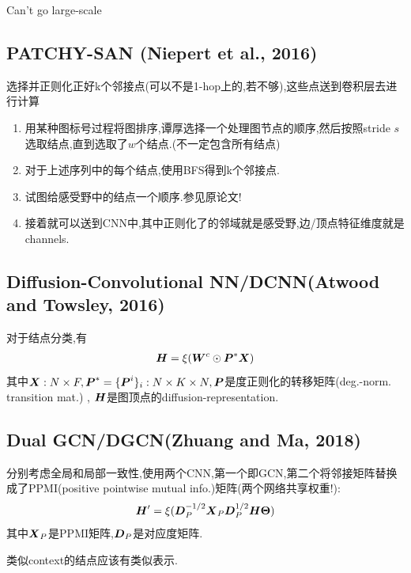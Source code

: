 \documentclass{article}
\begin{document}
 Can't go large-scale

\subsection{PATCHY-SAN (Niepert et al., 2016)}

 选择并正则化正好k个邻接点(可以不是1-hop上的,若不够),这些点送到卷积层去进行计算

\begin{enumerate}
    \item {} 用某种图标号过程将图排序,谭厚选择一个处理图节点的顺序,然后按照stride $s$选取结点,直到选取了$w$个结点.(不一定包含所有结点)
    \item {} 对于上述序列中的每个结点,使用BFS得到k个邻接点.
    \item {} 试图给感受野中的结点一个顺序.参见原论文!
    \item {} 接着就可以送到CNN中,其中正则化了的邻域就是感受野,边/顶点特征维度就是channels.
\end{enumerate}

\subsection{Diffusion-Convolutional NN/DCNN(Atwood and Towsley, 2016)}

 对于结点分类,有
\begin{align}
    \boldsymbol{H}=\xi(\boldsymbol{W}^c \odot \boldsymbol{P}^* \boldsymbol{X})
\end{align}
其中$\boldsymbol{X}:N\times F, \boldsymbol{P}^*=\{\boldsymbol{P}^{i}\}_i:N\times K \times N,\boldsymbol{P}$是度正则化的转移矩阵(deg.-norm. transition mat.) , $\boldsymbol{H}$是图顶点的diffusion-representation.

\subsection{Dual GCN/DGCN(Zhuang and Ma, 2018)}

 分别考虑全局和局部一致性,使用两个CNN,第一个即GCN,第二个将邻接矩阵替换成了PPMI(positive pointwise mutual info.)矩阵(两个网络共享权重!):
\begin{align}
    \boldsymbol{H}'=\xi(\boldsymbol{D}_P^{-1/2} \boldsymbol{X}_P \boldsymbol{D}_P^{1/2}\boldsymbol{H} \boldsymbol{\Theta})
\end{align}
其中$\boldsymbol{X}_P$是PPMI矩阵,$\boldsymbol{D}_P$是对应度矩阵.

 类似context的结点应该有类似表示.
\end{document}

